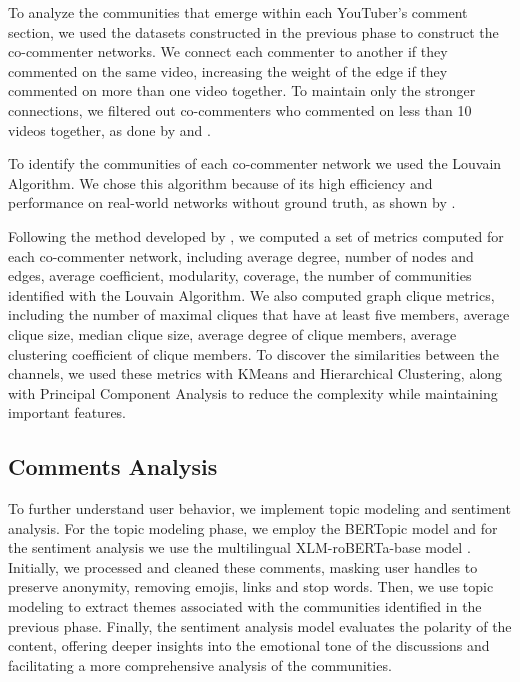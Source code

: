 \documentclass[12pt]{article}
\begin{document}
To analyze the communities that emerge within each YouTuber's comment section, we used the datasets constructed 
in the previous phase to construct the co-commenter networks. We connect each commenter to
another if they commented on the same video, increasing the weight of the edge if they commented
on more than one video together. To maintain only the stronger connections, we filtered out co-commenters
who commented on less than 10 videos together, as done by \cite{shajari2023} and \cite{kirdemir2023}. 

To identify the communities of each co-commenter network we used the Louvain Algorithm. We chose this 
algorithm because of its high efficiency and performance on real-world networks
without ground truth, as shown by \cite{YOU2020104822}.

Following the method developed by \cite{kirdemir2023}, we computed a set of metrics computed 
for each co-commenter network, including average degree, number of nodes and edges, average coefficient,
modularity, coverage, the number of communities identified with the Louvain Algorithm. We also computed graph clique 
metrics, including the number of maximal cliques that have at least five members, 
average clique size, median clique size, average degree of clique members, average clustering coefficient
of clique members. To discover the similarities between the channels, we used these metrics 
with KMeans and Hierarchical Clustering, along with Principal Component Analysis to reduce the complexity
while maintaining important features.

\subsection{Comments Analysis}

To further understand user behavior, we implement
topic modeling and sentiment analysis. For the topic modeling phase, we employ the BERTopic model 
\cite{bertopic2022} and for the sentiment analysis we use the multilingual 
XLM-roBERTa-base model \cite{barbieri-etal-2022-xlm}. 
Initially, we  processed and cleaned these comments, masking user handles to preserve anonymity,
removing emojis, links and stop words.
Then, we use topic modeling to extract themes associated with the communities identified in the 
previous phase. Finally, the sentiment analysis model evaluates the polarity of the content, 
offering deeper insights into the emotional tone of the discussions and facilitating a more 
comprehensive analysis of the communities.
\end{document}
